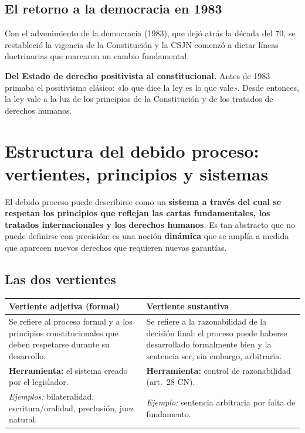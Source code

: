 \documentclass[12pt,oneside]{book}
\renewcommand{\arraystretch}{1.15}
\begin{document}
\subsection{El retorno a la democracia en 1983}

Con el advenimiento de la democracia (1983), que dejó atrás la década del 70, se restableció la vigencia de la Constitución y la CSJN comenzó a dictar líneas doctrinarias que marcaron un cambio fundamental.

\begin{importante}
\textbf{Del Estado de derecho positivista al constitucional.} Antes de 1983 primaba el positivismo clásico: «lo que dice la ley es lo que vale». Desde entonces, la ley vale a la luz de los principios de la Constitución y de los tratados de derechos humanos.
\end{importante}

\section{Estructura del debido proceso: vertientes, principios y sistemas}

El debido proceso puede describirse como un \textbf{sistema a través del cual se respetan los principios que reflejan las cartas fundamentales, los tratados internacionales y los derechos humanos}. Es tan abstracto que no puede definirse con precisión: es una noción \textbf{dinámica} que se amplía a medida que aparecen nuevos derechos que requieren nuevas garantías.

\subsection{Las dos vertientes}

\begin{table}[H]
\centering
\renewcommand{\arraystretch}{1.2}
\begin{tabularx}{\textwidth}{>{\RaggedRight\arraybackslash}X>{\RaggedRight\arraybackslash}X}
\toprule
\textbf{Vertiente adjetiva (formal)} & \textbf{Vertiente sustantiva} \\
\midrule
Se refiere al proceso formal y a los principios constitucionales que deben respetarse durante su desarrollo. & Se refiere a la razonabilidad de la decisión final: el proceso puede haberse desarrollado formalmente bien y la sentencia ser, sin embargo, arbitraria. \\
\addlinespace
\textbf{Herramienta:} el sistema creado por el legislador. & \textbf{Herramienta:} control de razonabilidad (art.~28 CN). \\
\addlinespace
\textit{Ejemplos:} bilateralidad, escritura/oralidad, preclusión, juez natural. & \textit{Ejemplo:} sentencia arbitraria por falta de fundamento. \\
\bottomrule
\end{tabularx}
\end{table}
\end{document}
